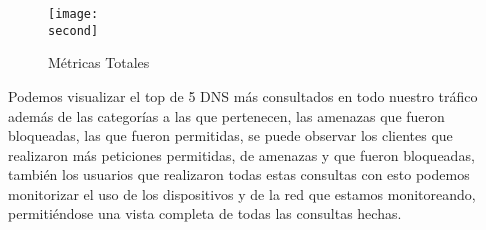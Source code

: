 \documentclass[a4paper]{article}
\newcommand{\second}{img/metricaTotal.png}
\begin{document}
    \begin{figure}[H] 
        \centering 
        \texttt{[image: \\second]} 
        \caption{Métricas Totales} 
    \end{figure} 

    Podemos visualizar el top de 5 DNS más consultados en todo nuestro tráfico además de las categorías a las que pertenecen, las amenazas que fueron bloqueadas, las que fueron permitidas, se puede observar los clientes que realizaron más peticiones permitidas, de amenazas y que fueron bloqueadas, también los usuarios que realizaron todas estas consultas con esto podemos monitorizar el uso de los dispositivos y de la red que estamos monitoreando, permitiéndose una vista completa de todas las consultas hechas.
\end{document}
